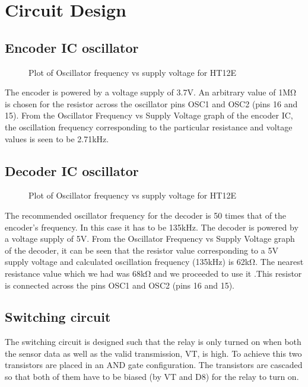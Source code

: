 \newpage
\chapter{Circuit Design}
\section{Encoder IC oscillator}
\begin{figure}[ht]
	\centering
	\caption{Plot of Oscillator frequency vs supply voltage for HT12E}
\end{figure}

\vspace*{.5cm}
The encoder is powered by a voltage supply of 3.7V. An arbitrary
value of 1MΩ is chosen for the resistor across the oscillator pins
OSC1 and OSC2 (pins 16 and 15). From the Oscillator Frequency vs
Supply Voltage graph of the encoder IC, the oscillation frequency
corresponding to the particular resistance and voltage values is seen
to be 2.71kHz.

\newpage

\section{Decoder IC oscillator}
\begin{figure}[ht]
	\centering
	\caption{Plot of Oscillator frequency vs supply voltage for HT12E}
\end{figure}

\vspace*{.5cm}
The recommended oscillator frequency for the decoder is 50 times that
of the encoder's frequency. In this case it has to be 135kHz. The
decoder is powered by a voltage supply of 5V. From the Oscillator
Frequency vs Supply Voltage graph of the decoder, it can be seen that
the resistor value corresponding to a 5V supply voltage and
calculated oscillation frequency (135kHz) is 62kΩ. The nearest
resistance value which we had was 68kΩ and we proceeded to use it
.This resistor is connected across the pins OSC1 and OSC2 (pins 16 and 15).

\section{Switching circuit}
The switching circuit is designed such that the relay is only turned
on when both the sensor data as well as the valid transmission, VT,
is high. To achieve this two transistors are placed in an AND gate
configuration. The transistors are cascaded so that both of them have
to be biased (by VT and D8) for the relay to turn on.


